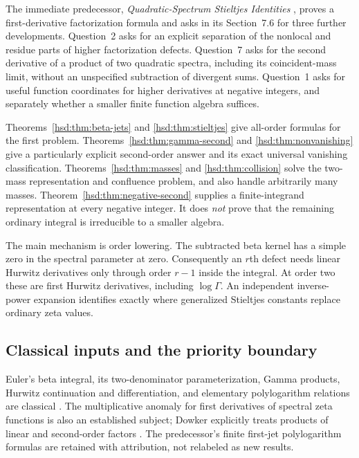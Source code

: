 \documentclass[11pt]{article}
\numberwithin{equation}{section}
\theoremstyle{definition}\newtheorem{definition}[theorem]{Definition}
\theoremstyle{remark}\newtheorem{remark}[theorem]{Remark}
\begin{document}
The immediate predecessor, \emph{Quadratic-Spectrum Stieltjes Identities}
\cite{hsd:predecessor}, proves a first-derivative factorization formula and
asks in its Section~7.6 for three further developments. Question~2 asks
for an explicit separation of the nonlocal and residue parts of higher
factorization defects. Question~7 asks for the second derivative of a
product of two quadratic spectra, including its coincident-mass limit,
without an unspecified subtraction of divergent sums. Question~1 asks
for useful function coordinates for higher derivatives at negative
integers, and separately whether a smaller finite function algebra suffices.

Theorems~\ref{hsd:thm:beta-jets} and \ref{hsd:thm:stieltjes}
give all-order formulas for the first problem.
Theorems~\ref{hsd:thm:gamma-second} and \ref{hsd:thm:nonvanishing}
give a particularly explicit second-order answer and its exact universal
vanishing classification. Theorems~\ref{hsd:thm:masses} and
\ref{hsd:thm:collision} solve the two-mass representation and confluence
problem, and also handle arbitrarily many masses.
Theorem~\ref{hsd:thm:negative-second} supplies a finite-integrand
representation at every negative integer. It does \emph{not} prove that
the remaining ordinary integral is irreducible to a smaller algebra.

The main mechanism is order lowering. The subtracted beta kernel has a
simple zero in the spectral parameter at zero. Consequently an $r$th
defect needs linear Hurwitz derivatives only through order $r-1$ inside
the integral. At order two these are first Hurwitz derivatives, including
$\log\Gamma$. An independent inverse-power expansion identifies exactly
where generalized Stieltjes constants replace ordinary zeta values.

\subsection{Classical inputs and the priority boundary}
Euler's beta integral, its two-denominator parameterization, Gamma
products, Hurwitz continuation and differentiation, and elementary
polylogarithm relations are classical \cite{hsd:beta,hsd:gamma,hsd:hurwitz,hsd:polylog}.
The multiplicative anomaly for first derivatives of spectral zeta
functions is also an established subject; Dowker explicitly treats
products of linear and second-order factors \cite{hsd:dowker}.
The predecessor's finite first-jet polylogarithm formulas are retained
with attribution, not relabeled as new results.
\end{document}
